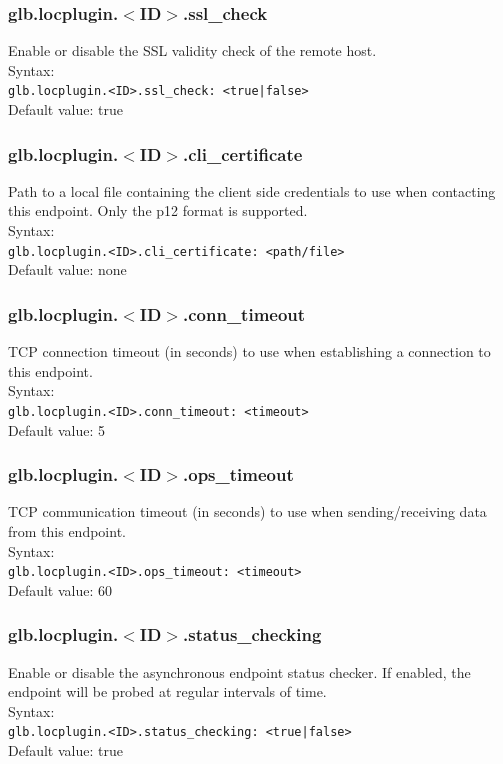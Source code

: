 \documentclass[12pt]{article} %
\begin{document}
\subsubsection{glb.locplugin.$<$ID$>$.ssl\_check}
Enable or disable the SSL validity check of the remote host.\\
Syntax:\\
\verb"glb.locplugin.<ID>.ssl_check: <true|false>"\\
Default value: true\\
\subsubsection{glb.locplugin.$<$ID$>$.cli\_certificate}
Path to a local file containing the client side credentials to use when contacting this endpoint. Only the p12 format is supported.\\
Syntax:\\
\verb"glb.locplugin.<ID>.cli_certificate: <path/file>"\\
Default value: none\\
\subsubsection{glb.locplugin.$<$ID$>$.conn\_timeout}
TCP connection timeout (in seconds) to use when establishing a connection to this endpoint. \\
Syntax:\\
\verb"glb.locplugin.<ID>.conn_timeout: <timeout>"\\
Default value: 5\\
\subsubsection{glb.locplugin.$<$ID$>$.ops\_timeout}
TCP communication timeout (in seconds) to use when sending/receiving data from this endpoint.\\
Syntax:\\
\verb"glb.locplugin.<ID>.ops_timeout: <timeout>"\\
Default value: 60\\
\subsubsection{glb.locplugin.$<$ID$>$.status\_checking}
Enable or disable the asynchronous endpoint status checker. If enabled, the endpoint will be probed at regular intervals of time.\\
Syntax:\\
\verb"glb.locplugin.<ID>.status_checking: <true|false>"\\
Default value: true\\
\end{document}
